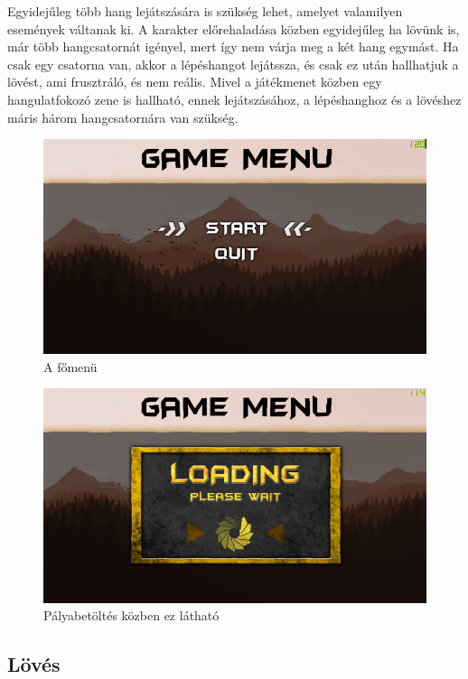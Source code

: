 Egyidejűleg több hang lejátszására is szükség lehet, amelyet valamilyen események váltanak ki. A karakter előrehaladása közben egyidejűleg ha lövünk is, már több hangcsatornát igényel, mert így nem várja meg a két hang egymást. Ha csak egy csatorna van, akkor a lépéshangot lejátssza, és csak ez után hallhatjuk a lövést, ami frusztráló, és nem reális. Mivel a játékmenet közben egy hangulatfokozó zene is hallható, ennek lejátszásához, a lépéshanghoz és a lövéshez máris három hangcsatornára van szükség. 

\begin{figure}[h]
\centering
\includegraphics[scale=1.6]{kepek/menu.png}
\caption{A főmenü}
\label{fig:menu}
\end{figure}

\begin{figure}[h]
\centering
\includegraphics[scale=1.6]{kepek/loading_screen.png}
\caption{Pályabetöltés közben ez látható}
\label{fig:loading}
\end{figure}

\subsection{Lövés}

